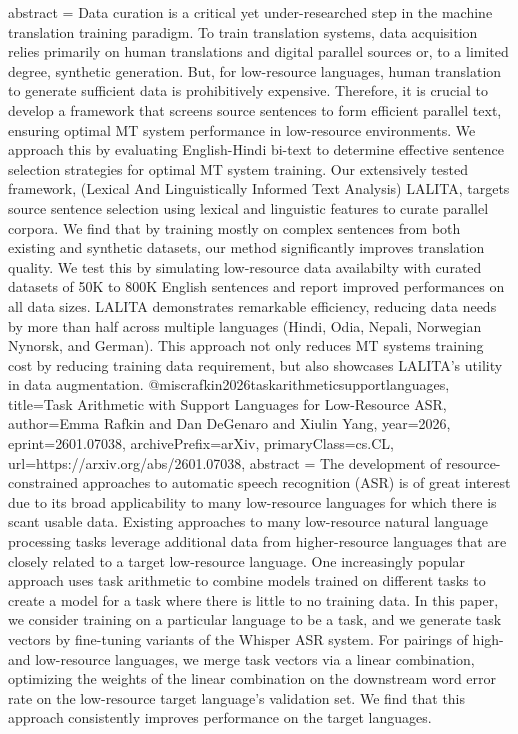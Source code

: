 {      abstract = {Data curation is a critical yet under-researched step in the machine translation training paradigm. To train translation systems, data acquisition relies primarily on human translations and digital parallel sources or, to a limited degree, synthetic generation. But, for low-resource languages, human translation to generate sufficient data is prohibitively expensive. Therefore, it is crucial to develop a framework that screens source sentences to form efficient parallel text, ensuring optimal MT system performance in low-resource environments. We approach this by evaluating English-Hindi bi-text to determine effective sentence selection strategies for optimal MT system training. Our extensively tested framework, (Lexical And Linguistically Informed Text Analysis) LALITA, targets source sentence selection using lexical and linguistic features to curate parallel corpora. We find that by training mostly on complex sentences from both existing and synthetic datasets, our method significantly improves translation quality. We test this by simulating low-resource data availabilty with curated datasets of 50K to 800K English sentences and report improved performances on all data sizes. LALITA demonstrates remarkable efficiency, reducing data needs by more than half across multiple languages (Hindi, Odia, Nepali, Norwegian Nynorsk, and German). This approach not only reduces MT systems training cost by reducing training data requirement, but also showcases LALITA's utility in data augmentation.}
}@misc{rafkin2026taskarithmeticsupportlanguages,
      title={Task Arithmetic with Support Languages for Low-Resource ASR}, 
      author={Emma Rafkin and Dan DeGenaro and Xiulin Yang},
      year={2026},
      eprint={2601.07038},
      archivePrefix={arXiv},
      primaryClass={cs.CL},
      url={https://arxiv.org/abs/2601.07038},
      abstract = {The development of resource-constrained approaches to automatic speech recognition (ASR) is of great interest due to its broad applicability to many low-resource languages for which there is scant usable data. Existing approaches to many low-resource natural language processing tasks leverage additional data from higher-resource languages that are closely related to a target low-resource language. One increasingly popular approach uses task arithmetic to combine models trained on different tasks to create a model for a task where there is little to no training data. In this paper, we consider training on a particular language to be a task, and we generate task vectors by fine-tuning variants of the Whisper ASR system. For pairings of high- and low-resource languages, we merge task vectors via a linear combination, optimizing the weights of the linear combination on the downstream word error rate on the low-resource target language's validation set. We find that this approach consistently improves performance on the target languages.}
}
